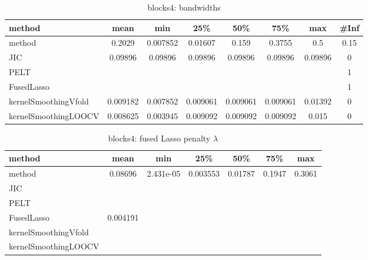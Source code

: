 \begin{table}[ht]
\centering
\begin{tabular}{l|c|ccccc|c}
  \hline
method & mean & min & 25\% & 50\% & 75\% & max & \#Inf \\ 
  \hline
method & 0.2029 & 0.007852 & 0.01607 & 0.159 & 0.3755 &   0.5 & 0.15 \\ 
  JIC & 0.09896 & 0.09896 & 0.09896 & 0.09896 & 0.09896 & 0.09896 &   0 \\ 
  PELT &  &  &  &  &  &  &   1 \\ 
  FusedLasso &  &  &  &  &  &  &   1 \\ 
  kernelSmoothingVfold & 0.009182 & 0.007852 & 0.009061 & 0.009061 & 0.009061 & 0.01392 &   0 \\ 
  kernelSmoothingLOOCV & 0.008625 & 0.003945 & 0.009092 & 0.009092 & 0.009092 & 0.015 &   0 \\ 
   \hline
\end{tabular}
\caption{blocks4: bandwidths} 
\label{tab:blocks4Bandwidths}
\end{table}
\begin{table}[ht]
\centering
\begin{tabular}{l|c|ccccc}
  \hline
method & mean & min & 25\% & 50\% & 75\% & max \\ 
  \hline
method & 0.08696 & 2.431e-05 & 0.003553 & 0.01787 & 0.1947 & 0.3061 \\ 
  JIC &  &  &  &  &  &  \\ 
  PELT &  &  &  &  &  &  \\ 
  FusedLasso & 0.004191 &  &  &  &  &  \\ 
  kernelSmoothingVfold &  &  &  &  &  &  \\ 
  kernelSmoothingLOOCV &  &  &  &  &  &  \\ 
   \hline
\end{tabular}
\caption{blocks4: fused Lasso penalty $\lambda$} 
\label{tab:blocks4Lambdas}
\end{table}
